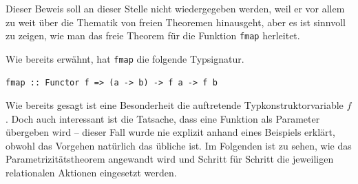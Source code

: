 Dieser Beweis soll an dieser Stelle nicht wiedergegeben werden, weil er vor allem zu weit über die Thematik von freien Theoremen
hinausgeht, aber es ist sinnvoll zu zeigen, wie man das freie Theorem für die Funktion \texttt{fmap} herleitet.

Wie bereits erwähnt, hat \texttt{fmap} die folgende Typsignatur.

\begin{verbatim}
fmap :: Functor f => (a -> b) -> f a -> f b
\end{verbatim}

Wie bereits gesagt ist eine Besonderheit die auftretende Typkonstruktorvariable $f$. Doch auch interessant ist die Tatsache, dass
eine Funktion als Parameter übergeben wird -- dieser Fall wurde nie explizit anhand eines Beispiels erklärt, obwohl das Vorgehen
natürlich das übliche ist.
Im Folgenden ist zu sehen, wie das Parametrizitätstheorem angewandt wird und Schritt für Schritt die jeweiligen relationalen Aktionen
eingesetzt werden.


